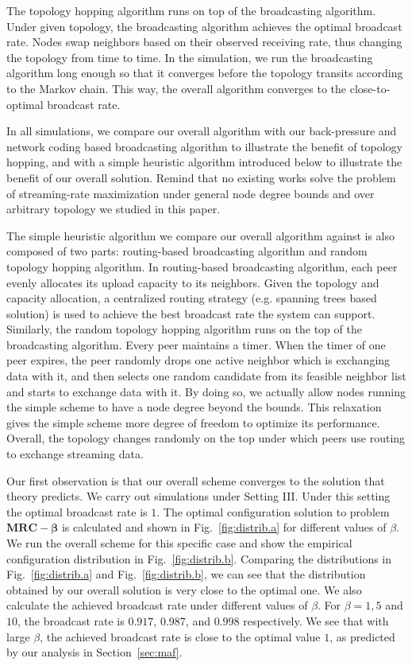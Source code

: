 \documentclass[10pt,conference]{IEEEtran}
\begin{document}
The topology hopping algorithm runs on top of the broadcasting algorithm. Under given topology, the broadcasting algorithm achieves the optimal broadcast rate. Nodes swap neighbors based on their observed receiving rate, thus changing the topology from time to time. In the simulation, we run the broadcasting algorithm long enough so that it converges before the topology transits according to the Markov chain. This way, the overall algorithm converges to the close-to-optimal broadcast rate.

In all simulations, we compare our overall algorithm with our back-pressure and network coding based broadcasting algorithm to illustrate the benefit of topology hopping, and with a simple heuristic algorithm introduced below to illustrate the benefit of our overall solution. Remind that no existing works solve the problem of streaming-rate maximization under general node degree bounds and over arbitrary topology we studied in this paper.

The simple heuristic algorithm we compare our overall algorithm against is also composed of two parts: routing-based broadcasting algorithm and random topology hopping algorithm. In routing-based broadcasting algorithm, each peer evenly allocates its upload capacity to its neighbors. Given the topology and capacity allocation, a centralized routing strategy (e.g. spanning trees based solution) is used to achieve the best broadcast rate the system can support. Similarly, the random topology hopping algorithm runs on the top of the broadcasting algorithm. Every peer maintains a timer. When the timer of one peer expires, the peer randomly drops one active neighbor which is exchanging data with it, and then selects one random candidate from its feasible neighbor list and starts to exchange data with it. By doing so, we actually allow nodes running the simple scheme to have a node degree beyond the bounds. This relaxation gives the simple scheme more degree of freedom to optimize its performance. Overall, the topology changes randomly on the top under which peers use routing to exchange streaming data.

Our first observation is that our overall scheme converges to the solution that theory predicts. We carry out simulations under Setting III.  Under this setting the optimal broadcast rate is $1$. The optimal configuration solution to problem $\mathbf{MRC-\beta}$ is calculated and shown in Fig.~\ref{fig:distrib.a} for different values of $\beta$. We run the overall scheme for this specific case and show the empirical configuration distribution in Fig.~\ref{fig:distrib.b}. Comparing the distributions in Fig.~\ref{fig:distrib.a} and Fig.~\ref{fig:distrib.b}, we can see that the distribution obtained by our overall solution is very close to the optimal one. We also calculate the achieved broadcast rate under different values of $\beta$. For $\beta=1,5$ and $10$, the broadcast rate is $0.917$, $0.987$, and $0.998$ respectively. We see that with large $\beta$, the achieved broadcast rate is close to the optimal value $1$, as predicted by our analysis in Section~\ref{sec:maf}.
\end{document}

